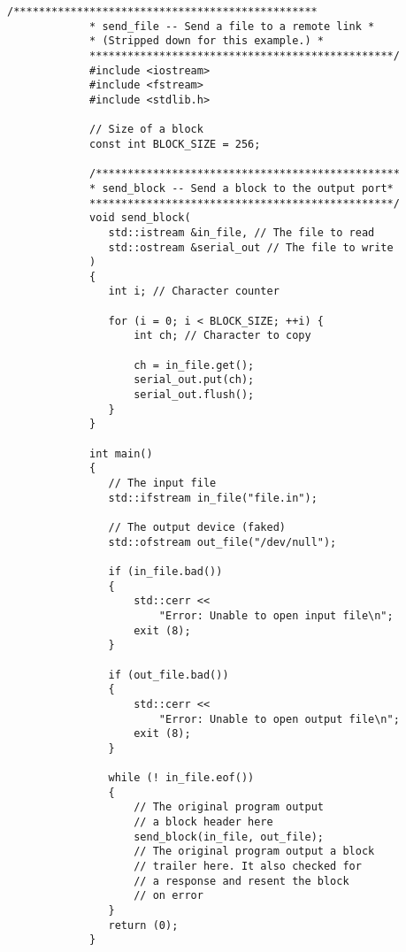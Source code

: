 \begin{LTR}
        \begin{lstlisting}[style=C++Style]
             /************************************************
             * send_file -- Send a file to a remote link *
             * (Stripped down for this example.) *
             ************************************************/
             #include <iostream>
             #include <fstream>
             #include <stdlib.h>

             // Size of a block
             const int BLOCK_SIZE = 256;

             /************************************************
             * send_block -- Send a block to the output port*
             ************************************************/
             void send_block(
             	std::istream &in_file, // The file to read
             	std::ostream &serial_out // The file to write
             )
             {
             	int i; // Character counter

             	for (i = 0; i < BLOCK_SIZE; ++i) {
             		int ch; // Character to copy

             		ch = in_file.get();
             		serial_out.put(ch);
             		serial_out.flush();
             	}
             }

             int main()
             {
             	// The input file
             	std::ifstream in_file("file.in");

             	// The output device (faked)
             	std::ofstream out_file("/dev/null");

             	if (in_file.bad())
             	{
             		std::cerr <<
             			"Error: Unable to open input file\n";
             		exit (8);
             	}

             	if (out_file.bad())
             	{
             		std::cerr <<
             			"Error: Unable to open output file\n";
             		exit (8);
             	}

             	while (! in_file.eof())
             	{
             		// The original program output
             		// a block header here
             		send_block(in_file, out_file);
             		// The original program output a block
             		// trailer here. It also checked for
             		// a response and resent the block
             		// on error
             	}
             	return (0);
             }
        \end{lstlisting}
\end{LTR}

